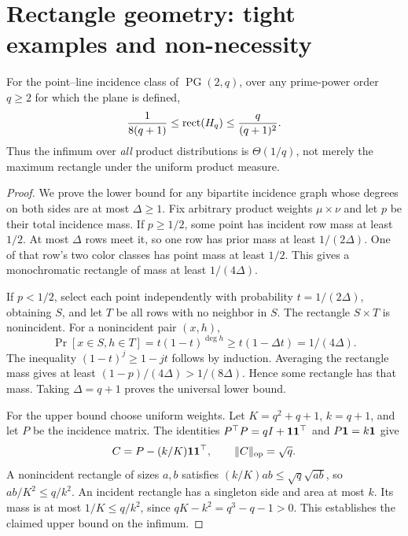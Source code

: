 \section{Rectangle geometry: tight examples and non-necessity}\label{sec:landscape}
\begin{samepage}
\begin{theorem}\label{thm:pgglobal}
For the point--line incidence class of $\operatorname{PG}(2,q)$, over any prime-power order $q\ge2$ for which the plane is defined,
\[
 \frac1{8(q+1)}\le\operatorname{rect}(H_q)\le\frac{q}{(q+1)^2}.
\]
Thus the infimum over \emph{all} product distributions is $\Theta(1/q)$, not merely the maximum rectangle under the uniform product measure.
\end{theorem}
\end{samepage}
\begin{proof}
We prove the lower bound for any bipartite incidence graph whose degrees on both sides are at most $\Delta\ge1$. Fix arbitrary product weights $\mu\times\nu$ and let $p$ be their total incidence mass. If $p\ge1/2$, some point has incident row mass at least $1/2$. At most $\Delta$ rows meet it, so one row has prior mass at least $1/(2\Delta)$. One of that row's two color classes has point mass at least $1/2$. This gives a monochromatic rectangle of mass at least $1/(4\Delta)$.

If $p<1/2$, select each point independently with probability $t=1/(2\Delta)$, obtaining $S$, and let $T$ be all rows with no neighbor in $S$. The rectangle $S\times T$ is nonincident. For a nonincident pair $(x,h)$,
\[
 \Pr[x\in S,h\in T]=t(1-t)^{\deg h}
 \ge t(1-\Delta t)=1/(4\Delta).
\]
The inequality $(1-t)^j\ge1-jt$ follows by induction. Averaging the rectangle mass gives at least $(1-p)/(4\Delta)>1/(8\Delta)$. Hence some rectangle has that mass. Taking $\Delta=q+1$ proves the universal lower bound.

For the upper bound choose uniform weights. Let $K=q^2+q+1$, $k=q+1$, and let $P$ be the incidence matrix. The identities $P^\top P=qI+\mathbf 1\mathbf 1^\top$ and $P\mathbf 1=k\mathbf 1$ give
\[
 C=P-(k/K)\mathbf 1\mathbf 1^\top,\qquad \|C\|_{\rm op}=\sqrt q.
\]
A nonincident rectangle of sizes $a,b$ satisfies $(k/K)ab\le\sqrt q\sqrt{ab}$, so $ab/K^2\le q/k^2$. An incident rectangle has a singleton side and area at most $k$. Its mass is at most $1/K\le q/k^2$, since $qK-k^2=q^3-q-1>0$. This establishes the claimed upper bound on the infimum.
\end{proof}

